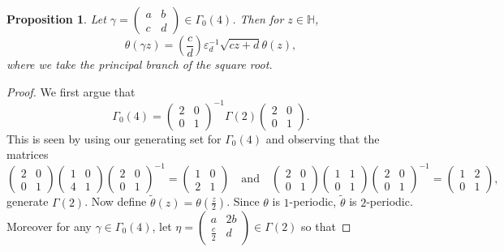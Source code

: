 \documentclass[12pt]{book}
\newtheorem{proposition}{Proposition}[section]
\theoremstyle{definition}\newframedtheorem{method}{Method}
\newcommand{\legendre}[2]{\genfrac{(}{)}{0.5pt}{0}{#1}{#2}}
\renewcommand{\H}{\mathbb{H}}
\newcommand{\g}{\gamma}
\renewcommand{\t}{\theta}
\newcommand{\G}{\Gamma}
\newcommand{\e}{\varepsilon}
\newcommand{\<}{\langle}
\renewcommand{\>}{\rangle}
\newcommand{\wtilde}{\widetilde}
\begin{document}
    \begin{proposition}
      Let $\g = \begin{pmatrix} a & b \\ c & d \end{pmatrix} \in \G_{0}(4)$. Then for $z \in \H$,
      \[
        \t(\g z) = \legendre{c}{d}\e_{d}^{-1}\sqrt{cz+d}\t(z),
      \]
      where we take the principal branch of the square root.
    \end{proposition}
    \begin{proof}
      We first argue that
      \[
        \G_{0}(4) = \begin{pmatrix} 2 & 0 \\ 0 & 1 \end{pmatrix}^{-1} \G(2) \begin{pmatrix} 2 & 0 \\ 0 & 1 \end{pmatrix}.
      \]
      This is seen by using our generating set for $\G_{0}(4)$ and observing that the matrices
      \[
        \begin{pmatrix} 2 & 0 \\ 0 & 1 \end{pmatrix} \begin{pmatrix} 1 & 0 \\ 4 & 1 \end{pmatrix} \begin{pmatrix} 2 & 0 \\ 0 & 1 \end{pmatrix}^{-1} = \begin{pmatrix} 1 & 0 \\ 2 & 1 \end{pmatrix} \quad \text{and} \quad \begin{pmatrix} 2 & 0 \\ 0 & 1 \end{pmatrix} \begin{pmatrix} 1 & 1 \\ 0 & 1 \end{pmatrix} \begin{pmatrix} 2 & 0 \\ 0 & 1 \end{pmatrix}^{-1} = \begin{pmatrix} 1 & 2 \\ 0 & 1 \end{pmatrix},
      \]
      generate $\G(2)$. Now define $\wtilde{\t}(z) = \theta\left(\frac{z}{2}\right)$. Since $\theta$ is $1$-periodic, $\wtilde{\t}$ is $2$-periodic. Moreover for any $\g \in \G_{0}(4)$, let $\eta = \begin{pmatrix} a & 2b \\ \frac{c}{2} & d\end{pmatrix} \in \G(2)$ so that

\end{proof}
\end{document}
